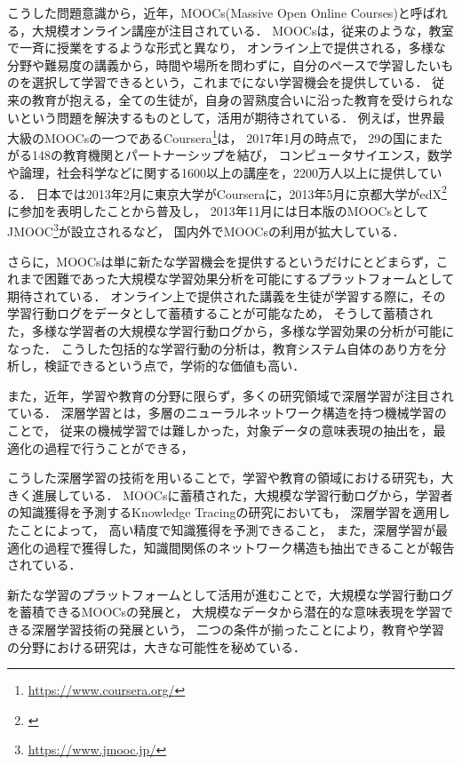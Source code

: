 こうした問題意識から，近年，MOOCs(Massive Open Online Courses)と呼ばれる，大規模オンライン講座が注目されている．
MOOCsは，従来のような，教室で一斉に授業をするような形式と異なり，
オンライン上で提供される，多様な分野や難易度の講義から，時間や場所を問わずに，自分のペースで学習したいものを選択して学習できるという，これまでにない学習機会を提供している．
従来の教育が抱える，全ての生徒が，自身の習熟度合いに沿った教育を受けられないという問題を解決するものとして，活用が期待されている．
例えば，世界最大級のMOOCsの一つであるCoursera\footnote{\url{https://www.coursera.org/}}は，
2017年1月の時点で，
29の国にまたがる148の教育機関とパートナーシップを結び，
コンピュータサイエンス，数学や論理，社会科学などに関する1600以上の講座を，2200万人以上に提供している．
日本では2013年2月に東京大学がCourseraに，2013年5月に京都大学がedX\footnote{\url{}}に参加を表明したことから普及し，
2013年11月には日本版のMOOCsとしてJMOOC\footnote{\url{https://www.jmooc.jp/}}が設立されるなど，
国内外でMOOCsの利用が拡大している．


さらに，MOOCsは単に新たな学習機会を提供するというだけにとどまらず，これまで困難であった大規模な学習効果分析を可能にするプラットフォームとして期待されている．
オンライン上で提供された講義を生徒が学習する際に，その学習行動ログをデータとして蓄積することが可能なため，
そうして蓄積された，多様な学習者の大規模な学習行動ログから，多様な学習効果の分析が可能になった．
こうした包括的な学習行動の分析は，教育システム自体のあり方を分析し，検証できるという点で，学術的な価値も高い．


また，近年，学習や教育の分野に限らず，多くの研究領域で深層学習が注目されている．
深層学習とは，多層のニューラルネットワーク構造を持つ機械学習のことで，
従来の機械学習では難しかった，対象データの意味表現の抽出を，最適化の過程で行うことができる，

こうした深層学習の技術を用いることで，学習や教育の領域における研究も，大きく進展している．
MOOCsに蓄積された，大規模な学習行動ログから，学習者の知識獲得を予測するKnowledge Tracingの研究においても，
深層学習を適用したことによって，
高い精度で知識獲得を予測できること，
また，深層学習が最適化の過程で獲得した，知識間関係のネットワーク構造も抽出できることが報告されている．


新たな学習のプラットフォームとして活用が進むことで，大規模な学習行動ログを蓄積できるMOOCsの発展と，
大規模なデータから潜在的な意味表現を学習できる深層学習技術の発展という，
二つの条件が揃ったことにより，教育や学習の分野における研究は，大きな可能性を秘めている．

